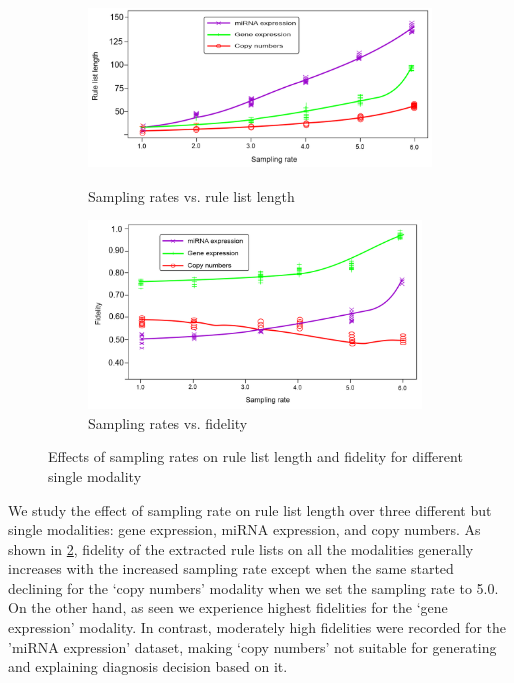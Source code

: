 \begin{figure}[h!]
	\centering
	\begin{subfigure}{.48\linewidth}
		\centering
		\includegraphics[width=\linewidth,height=50mm]{images/sr_vs_ll.png}
		\caption{Sampling rates vs. rule list length}
        \label{fig:lr_vs_length}
	\end{subfigure}
	\begin{subfigure}{0.48\linewidth}
		\centering
		\includegraphics[width=\linewidth,height=50mm]{images/sr_vs_fide.png}
		\caption{Sampling rates vs. fidelity}
        \label{fig:lr_vs_fidelity}
	\end{subfigure}
	\caption{Effects of sampling rates on rule list length and fidelity for different single modality} 
	\label{fig:lr_vs_length_and_fidelity}
\end{figure}

\hspace*{3.5mm} We study the effect of sampling rate on rule list length over three different but single modalities: gene expression, miRNA expression, and copy numbers. 
As shown in \cref{fig:lr_vs_fidelity}, fidelity of the extracted rule lists on all the modalities generally increases with the increased sampling rate except when the same started declining for the `copy numbers' modality when we set the sampling rate to 5.0. On the other hand, as seen we experience highest fidelities for the `gene expression' modality. In contrast,  moderately high fidelities were recorded for the 'miRNA expression' dataset, making `copy numbers' not suitable for generating and explaining diagnosis decision based on it. 


